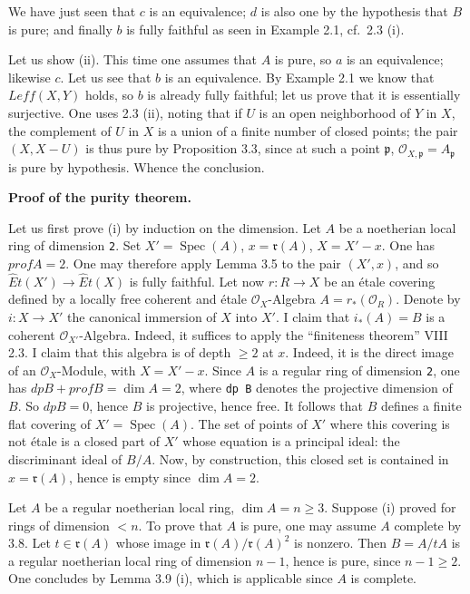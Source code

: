 \documentclass[
  11pt,
  a4paper,
]{book}
\begin{document}
We have just seen that \(c\) is an equivalence; \(d\) is also one by the
hypothesis that \(B\) is pure; and finally \(b\) is fully faithful as
seen in Example 2.1, cf.~2.3 (i).

Let us show (ii). This time one assumes that \(A\) is pure, so \(a\) is
an equivalence; likewise \(c\). Let us see that \(b\) is an equivalence.
By Example 2.1 we know that \(Leff(X, Y)\) holds, so \(b\) is already
fully faithful; let us prove that it is essentially surjective. One uses
2.3 (ii), noting that if \(U\) is an open neighborhood of \(Y\) in
\(X\), the complement of \(U\) in \(X\) is a union of a finite number of
closed points; the pair \((X, X - U)\) is thus pure by Proposition 3.3,
since at such a point \(\mathfrak{p}\),
\(\mathcal{O}_{X,\mathfrak{p}} = A_{\mathfrak{p}}\) is pure by
hypothesis. Whence the conclusion.

\textbf{Proof of the purity theorem.}

Let us first prove (i) by induction on the dimension. Let \(A\) be a
noetherian local ring of dimension \texttt{2}. Set \(X' =
\operatorname{Spec}(A)\), \(x = \mathfrak{r}(A)\), \(X = X' - {x}\). One
has \(prof A = 2\). One may therefore apply Lemma 3.5 to the pair
\((X', {x})\), and so \(\hat{E}t(X') \to \hat{E}t(X)\) is fully
faithful. Let now \(r: R \to X\) be an étale covering defined by a
locally free coherent and étale \(\mathcal{O}_{X}\)-Algebra
\(A = r_{*}(\mathcal{O}_{R})\). Denote by \(i: X \to X'\) the canonical
immersion of \(X\) into \(X'\). I claim that \(i_{*}(A) = B\) is a
coherent \(\mathcal{O}_{X'}\)-Algebra. Indeed, it suffices to apply the
``finiteness theorem'' VIII 2.3. I claim that this algebra is of depth
\(\geqslant 2\) at \(x\). Indeed, it is the direct image of an
\(\mathcal{O}_{X}\)-Module, with \(X = X' - {x}\). Since \(A\) is a
regular ring of dimension \texttt{2}, one has
\(dp B + prof B = \dim A = 2\), where \texttt{dp\ B} denotes the
projective dimension of \(B\). So \(dp B = 0\), hence \(B\) is
projective, hence free. It follows that \(B\) defines a finite flat
covering of \(X' = \operatorname{Spec}(A)\). The set of points of \(X'\)
where this covering is not étale is a closed part of \(X'\) whose
equation is a principal ideal: the discriminant ideal of \(B/A\). Now,
by construction, this closed set is contained in
\(x = \mathfrak{r}(A)\), hence is empty since \(\dim A = 2\).

Let \(A\) be a regular noetherian local ring,
\(\dim A = n \geqslant 3\). Suppose (i) proved for rings of dimension
\(< n\). To prove that \(A\) is pure, one may assume \(A\) complete by
3.8. Let \(t \in \mathfrak{r}(A)\) whose image in
\(\mathfrak{r}(A)/\mathfrak{r}(A)^{2}\) is nonzero. Then \(B = A/tA\) is
a regular noetherian local ring of dimension \(n -
1\), hence is pure, since \(n - 1 \geqslant 2\). One concludes by Lemma
3.9 (i), which is applicable since \(A\) is complete.
\end{document}
